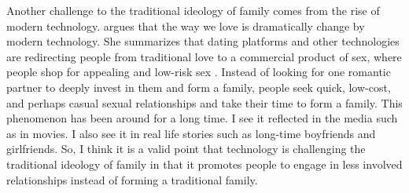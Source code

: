 \documentclass[12pt]{article}
\begin{document}
Another challenge to the traditional ideology of family comes from the rise
of modern technology. \citet{malinowska2022love} argues that the way we love is
dramatically change by modern technology.
She summarizes that dating platforms and other technologies are redirecting
people from traditional love to a commercial product of sex,
where people shop for appealing and low-risk sex \citep{malinowska2022love}.
Instead of looking for one romantic partner to deeply invest in them and form a
family, people seek quick, low-cost, and perhaps casual sexual relationships and
take their time to form a family.
This phenomenon has been around for a long time.
I see it reflected in the media such as in movies.
I also see it in real life stories such as long-time boyfriends and girlfriends.
So, I think it is a valid point that technology is challenging the traditional
ideology of family in that it promotes people to engage in less involved
relationships instead of forming a traditional family.

\pagebreak


\end{document}
